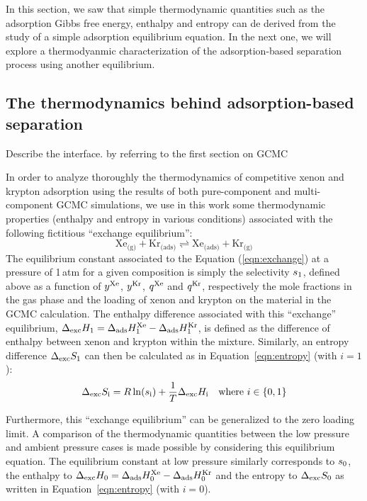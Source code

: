 \documentclass[main.tex]{subfiles}
\begin{document}
In this section, we saw that simple thermodynamic quantities such as the adsorption Gibbs free energy, enthalpy and entropy can de derived from the study of a simple adsorption equilibrium equation. In the next one, we will explore a thermodyanmic characterization of the adsorption-based separation process using another equilibrium. 

\subsection{The thermodynamics behind adsorption-based separation}\label{section:exchange}

Describe the interface. by referring to the first section on GCMC

In order to analyze thoroughly the thermodynamics of competitive xenon and krypton adsorption using the results of both pure-component and multi-component GCMC simulations, we use in this work some thermodynamic properties (enthalpy and entropy in various conditions) associated with the following fictitious ``exchange equilibrium'':
\begin{equation} \label{eqn:exchange}
    \text{Xe}_{\text{(g)}} + \text{Kr}_{\text{(ads)}}
    \rightleftharpoons \text{Xe}_{\text{(ads)}} + \text{Kr}_{\text{(g)}}
\end{equation}
The equilibrium constant associated to the Equation (\ref{eqn:exchange}) at a pressure of 1\,atm for a given composition is simply the selectivity $s_{\text{1}}$, defined above as a function of $y^{\text{Xe}}$, $y^{\text{Kr}}$, $q^{\text{Xe}}$ and $q^{\text{Kr}}$, respectively the mole fractions in the gas phase and the loading of xenon and krypton on the material in the GCMC calculation. The enthalpy difference associated with this ``exchange'' equilibrium, $\Delta_{\text{exc}}H_{\text{1}} = \Delta_{\text{ads}}H_{\text{1}}^{\text{Xe}} - \Delta_{\text{ads}}H_{\text{1}}^{\text{Kr}}$, is defined as the difference of enthalpy between xenon and krypton within the mixture. Similarly, an entropy difference $\Delta_{\text{exc}}S_{\text{1}}$ can then be calculated as in Equation~\ref{eqn:entropy} (with $i = 1$):
\begin{equation} \label{eqn:entropy}
    \Delta\e{exc}S\e{i} = R\ln(s\e{i}) + \dfrac{1}{T}\Delta\e{exc}H\e{i}\ \ \ \mathrm{where}\ i\in\{0,1\}
\end{equation}

Furthermore, this ``exchange equilibrium'' can be generalized to the zero loading limit. A comparison of the thermodynamic quantities between the low pressure and ambient pressure cases is made possible by considering this equilibrium equation. The equilibrium constant at low pressure similarly corresponds to $s_{\text{0}}$, the enthalpy to $\Delta_{\text{exc}}H_{\text{0}} = \Delta_{\text{ads}}H_{\text{0}}^{\text{Xe}} - \Delta_{\text{ads}}H_{\text{0}}^{\text{Kr}}$ and the entropy to $\Delta_{\text{exc}}S_{\text{0}}$ as written in Equation~\ref{eqn:entropy} (with $i = 0$).
\end{document}
